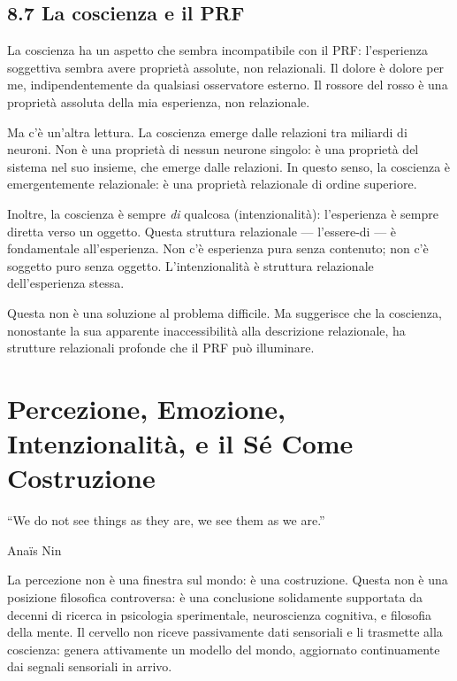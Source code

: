 \documentclass[11.5pt,a4paper,openany]{book}
\theoremstyle{remark}
\begin{document}
\section{8.7 La coscienza e il PRF}

La coscienza ha un aspetto che sembra incompatibile con il PRF: l'esperienza soggettiva sembra avere proprietà assolute, non relazionali. Il dolore è dolore per me, indipendentemente da qualsiasi osservatore esterno. Il rossore del rosso è una proprietà assoluta della mia esperienza, non relazionale.

Ma c'è un'altra lettura. La coscienza emerge dalle relazioni tra miliardi di neuroni. Non è una proprietà di nessun neurone singolo: è una proprietà del sistema nel suo insieme, che emerge dalle relazioni. In questo senso, la coscienza è emergentemente relazionale: è una proprietà relazionale di ordine superiore.

Inoltre, la coscienza è sempre \textit{di} qualcosa (intenzionalità): l'esperienza è sempre diretta verso un oggetto. Questa struttura relazionale --- l'essere-di --- è fondamentale all'esperienza. Non c'è esperienza pura senza contenuto; non c'è soggetto puro senza oggetto. L'intenzionalità è struttura relazionale dell'esperienza stessa.

Questa non è una soluzione al problema difficile. Ma suggerisce che la coscienza, nonostante la sua apparente inaccessibilità alla descrizione relazionale, ha strutture relazionali profonde che il PRF può illuminare.

\chapter{Percezione, Emozione, Intenzionalità, e il Sé Come Costruzione}

\epigraph{``We do not see things as they are, we see them as we are.''}{Anaïs Nin}

La percezione non è una finestra sul mondo: è una costruzione. Questa non è una posizione filosofica controversa: è una conclusione solidamente supportata da decenni di ricerca in psicologia sperimentale, neuroscienza cognitiva, e filosofia della mente. Il cervello non riceve passivamente dati sensoriali e li trasmette alla coscienza: genera attivamente un modello del mondo, aggiornato continuamente dai segnali sensoriali in arrivo.
\end{document}
